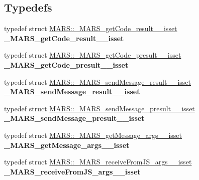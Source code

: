 \subsection*{Typedefs}
\begin{DoxyCompactItemize}
\item 
\mbox{\label{namespaceMARS_a6f0dcb2c217fe2e31c879b8fd3a34f13}} 
typedef struct \hyperlink{structMARS_1_1__MARS__getCode__result____isset}{M\+A\+R\+S\+::\+\_\+\+M\+A\+R\+S\+\_\+get\+Code\+\_\+result\+\_\+\+\_\+isset} {\bfseries \+\_\+\+M\+A\+R\+S\+\_\+get\+Code\+\_\+result\+\_\+\+\_\+isset}
\item 
\mbox{\label{namespaceMARS_a952a2af8169a969c08e68b0f86e969a1}} 
typedef struct \hyperlink{structMARS_1_1__MARS__getCode__presult____isset}{M\+A\+R\+S\+::\+\_\+\+M\+A\+R\+S\+\_\+get\+Code\+\_\+presult\+\_\+\+\_\+isset} {\bfseries \+\_\+\+M\+A\+R\+S\+\_\+get\+Code\+\_\+presult\+\_\+\+\_\+isset}
\item 
\mbox{\label{namespaceMARS_acb0bf0c557c16e9cacc2d2da90e3cbf1}} 
typedef struct \hyperlink{structMARS_1_1__MARS__sendMessage__result____isset}{M\+A\+R\+S\+::\+\_\+\+M\+A\+R\+S\+\_\+send\+Message\+\_\+result\+\_\+\+\_\+isset} {\bfseries \+\_\+\+M\+A\+R\+S\+\_\+send\+Message\+\_\+result\+\_\+\+\_\+isset}
\item 
\mbox{\label{namespaceMARS_ab3acbcfcc67ecd9c48e2367ee2263c33}} 
typedef struct \hyperlink{structMARS_1_1__MARS__sendMessage__presult____isset}{M\+A\+R\+S\+::\+\_\+\+M\+A\+R\+S\+\_\+send\+Message\+\_\+presult\+\_\+\+\_\+isset} {\bfseries \+\_\+\+M\+A\+R\+S\+\_\+send\+Message\+\_\+presult\+\_\+\+\_\+isset}
\item 
\mbox{\label{namespaceMARS_abb31949fab10fe22b7d72e5d0630a82a}} 
typedef struct \hyperlink{structMARS_1_1__MARS__getMessage__args____isset}{M\+A\+R\+S\+::\+\_\+\+M\+A\+R\+S\+\_\+get\+Message\+\_\+args\+\_\+\+\_\+isset} {\bfseries \+\_\+\+M\+A\+R\+S\+\_\+get\+Message\+\_\+args\+\_\+\+\_\+isset}
\item 
\mbox{\label{namespaceMARS_a1e54309d4e11c78d25ff75d21af260ea}} 
typedef struct \hyperlink{structMARS_1_1__MARS__receiveFromJS__args____isset}{M\+A\+R\+S\+::\+\_\+\+M\+A\+R\+S\+\_\+receive\+From\+J\+S\+\_\+args\+\_\+\+\_\+isset} {\bfseries \+\_\+\+M\+A\+R\+S\+\_\+receive\+From\+J\+S\+\_\+args\+\_\+\+\_\+isset}

\end{DoxyCompactItemize}
